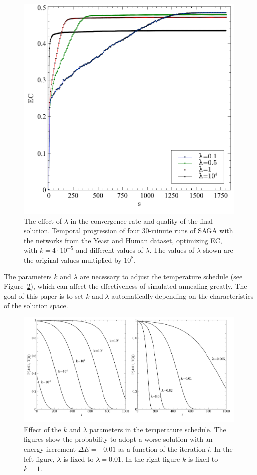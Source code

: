 \documentclass[]{article}
\begin{document}
\begin{figure}
\centering
\includegraphics[width=0.8\linewidth]{../figures/lambda}
\caption[Temperature schedule: $\lambda$]{The effect of $\lambda$ in the convergence rate and quality of the final solution. Temporal progression of four 30-minute runs of SAGA with the networks from the Yeast and Human dataset, optimizing EC, with $k=4\cdot10^{-5}$ and different values of $\lambda$. The values of $\lambda$ shown are the original values multiplied by $10^{8}$.}
\label{fig:lambda}
\end{figure}

The parameters $k$ and $\lambda$ are necessary to adjust the temperature schedule (see Figure~\ref{fig:parameters}), which can affect the effectiveness of simulated annealing greatly. The goal of this paper is to set $k$ and $\lambda$ automatically depending on the characteristics of the solution space.

\begin{figure}
\centering
\includegraphics[width=0.99\linewidth]{../figures/SA_parameters}
\caption[Probability to accept a worse solution]{Effect of the $k$ and $\lambda$ parameters in the temperature schedule. The figures show the probability to adopt a worse solution with an energy increment $\Delta E = -0.01$ as a function of the iteration $i$. In the left figure, $\lambda$ is fixed to $\lambda=0.01$. In the right figure $k$ is fixed to $k=1$.}
\label{fig:parameters}
\end{figure}
\end{document}
